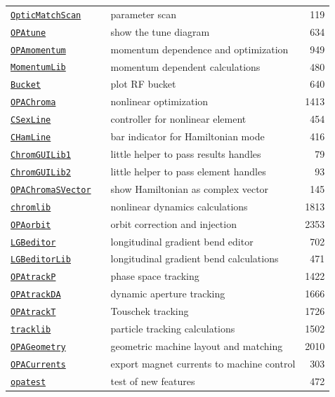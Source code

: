 \documentclass[12pt]{article}
\newcommand\code[1]{{\tt #1}}
\newcommand\guico[1]{{\color{blue}\code{#1}}}
\newcommand{\opagui}[1]{\colorbox{blue!20}{\code{#1}}}
\newcommand{\ogui}[1]{\hyperref[#1]{\opagui{#1}}}
\newcommand{\opaguif}[1]{\colorbox{violet!30}{\code{#1}}}
\newcommand{\oguif}[1]{\hyperref[#1]{\opaguif{#1}}}
\newcommand{\opauni}[1]{\colorbox{orange!30}{\code{#1}}}
\newcommand{\ouni}[1]{\hyperref[#1]{\opauni{#1}}}
\begin{document}
\begin{table}
{\begin{tabular}{lllr}
\ogui{OpticMatchScan} & \guico{TsetMatchScan}& parameter scan & 119 \\
\ogui{OPAtune} & \guico{TTunePlot} & show the tune diagram & 634 \\
\hline
\ogui{OPAmomentum} & \guico{Tmomentum} & momentum dependence and optimization & 949 \\
\ouni{MomentumLib} &  & momentum dependent calculations & 480 \\
\ogui{Bucket} & \guico{TBucketView} & plot RF bucket & 640 \\
\hline
\ogui{OPAChroma} & \guico{TChroma} & nonlinear optimization & 1413 \\
\oguif{CSexLine} & \guico{} & controller for nonlinear element & 454 \\
\oguif{CHamLine} & \guico{} & bar indicator for Hamiltonian mode & 416 \\
\ouni{ChromGUILib1} & & little helper to pass results handles & 79 \\
\ouni{ChromGUILib2} & & little helper to pass element handles & 93 \\
\ogui{OPAChromaSVector} & \guico{} & show Hamiltonian as complex vector & 145 \\
\ouni{chromlib} & & nonlinear dynamics calculations & 1813 \\
\hline
\ogui{OPAorbit} & \guico{} & orbit correction and injection & 2353 \\
\hline
\ogui{LGBeditor} & \guico{} & longitudinal gradient bend editor & 702 \\
\ouni{LGBeditorLib} & & longitudinal gradient bend calculations & 471 \\
\hline
\ogui{OPAtrackP} & \guico{} & phase space tracking & 1422 \\
\ogui{OPAtrackDA} & \guico{} & dynamic aperture tracking & 1666 \\
\ogui{OPAtrackT} & \guico{} & Touschek tracking & 1726 \\
\ouni{tracklib} & & particle tracking calculations & 1502 \\
\hline
\ogui{OPAGeometry} & \guico{} & geometric machine layout and matching & 2010 \\
\ogui{OPACurrents} & \guico{} & export magnet currents to machine control & 303 \\
\ouni{opatest} & & test of new features & 472 
\end{tabular}
}
\end{table}

\pagebreak
\end{document}
